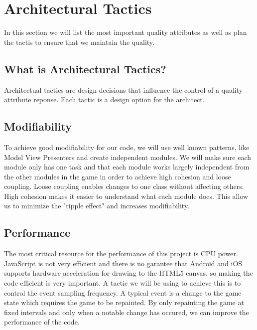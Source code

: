 \section{Architectural Tactics}
In this section we will list the most important quality attributes as well as plan the tactis to 
ensure that we maintain the quality.

\subsection*{What is Architectural Tactics? }
Architectual tactics are design decisions that influence the control of a quality attribute reponse. 
Each tactic is a design option for the architect. \cite{architecturalTactics}

\subsection*{Modifiability}
To achieve good modifiability for our code, we will use well known patterns, like Model View Presenters and create 
independent modules. We will make sure each module only has one task and that each module works 
largely independent from the other modules in the game in order to achieve high cohesion and loose 
coupling. Loose coupling enables changes to one class without affecting others. High cohesion makes 
it easier to understand what each module does. This allow us to minimize the "ripple effect" and 
increases modifiability.

\subsection*{Performance}
The most critical resource for the performance of this project is CPU power. JavaScript is not very 
efficient and there is no garantee that Android and iOS supports hardware acceleration for drawing 
to the HTML5 canvas, so making the code efficient is very important. A tactic we will be using to 
achieve this is to control the event sampling frequency. A typical event is a change to the game 
state which requires the game to be repainted. By only repainting the game at fixed intervals and 
only when a notable change has occured, we can improve the performance of the code.
